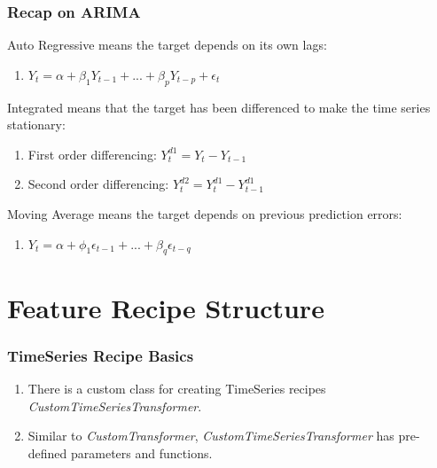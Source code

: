 \documentclass[11pt,
aspectratio=169,
hyperref={colorlinks}
]{beamer}
\begin{document}
\begin{frame}[fragile]
        \frametitle{Recap on ARIMA}
        Auto Regressive means the target depends on its own lags:
        \begin{enumerate}
                \item $Y_{t} = \alpha  + \beta_{1}Y_{t-1}+...+\beta_{p}Y_{t-p}+\epsilon_{t}$
        \end{enumerate}
        Integrated means that the target has been differenced to make the time series stationary:
        \begin{enumerate}
                \item First order differencing: $Y_{t}^{d1} = Y_{t} - Y_{t-1}$
                \item Second order differencing: $Y_{t}^{d2} = Y_{t}^{d1} - Y_{t-1}^{d1}$
        \end{enumerate}
        Moving Average means the target depends on previous prediction errors:
        \begin{enumerate}
                \item $Y_{t} = \alpha + \phi_{1}\epsilon_{t-1} + ... + \beta_{q}\epsilon_{t-q}$
        \end{enumerate}

\end{frame}
\section{Feature Recipe Structure}
\begin{frame}[fragile]
        \frametitle{TimeSeries Recipe Basics}
        \begin{enumerate}
                \item There is a custom class for creating TimeSeries recipes \textit{CustomTimeSeriesTransformer}. 
                \item Similar to \textit{CustomTransformer}, \textit{CustomTimeSeriesTransformer} has pre-defined parameters and functions. 
        \end{enumerate}

\end{frame}
\end{document}
